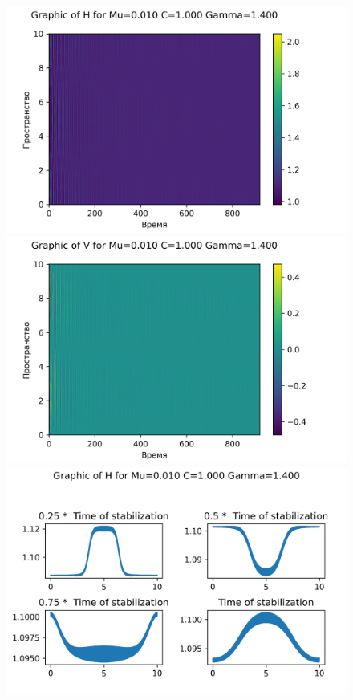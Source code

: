 \begin{figure}[H]
	\centering
	\includegraphics[scale=0.5]{../graphs_data_nonsmooth_1/value/Graph_H_mu0.010_C1.000_gamma1.400.png}
	\includegraphics[scale=0.5]{../graphs_data_nonsmooth_1/value/Graph_V_mu0.010_C1.000_gamma1.400.png}	
	\includegraphics[scale=0.5]{../graphs_data_nonsmooth_1/slices/Graph_H_mu0.010_C1.000_gamma1.400.png}

\end{figure}

